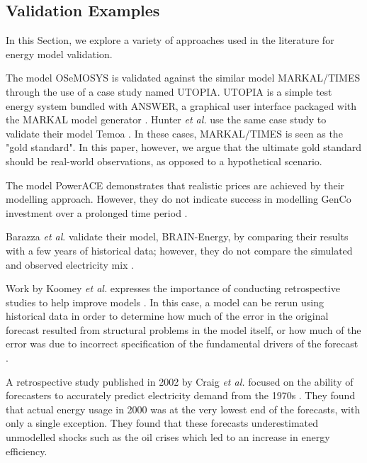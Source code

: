 \subsection{Validation Examples}

In this Section, we explore a variety of approaches used in the literature for energy model validation.

The model OSeMOSYS \cite{Howells2011} is validated against the similar model MARKAL\slash TIMES through the use of a case study named UTOPIA. UTOPIA is a simple test energy system bundled with ANSWER, a graphical user interface packaged with the MARKAL model generator \cite{Hunter2013, Noble2004}. Hunter \textit{et al.} use the same case study to validate their model Temoa \cite{Hunter2013}. In these cases, MARKAL\slash TIMES is seen as the "gold standard". In this paper, however, we argue that the ultimate gold standard should be real-world observations, as opposed to a hypothetical scenario.

The model PowerACE demonstrates that realistic prices are achieved by their modelling approach. However, they do not indicate success in modelling GenCo investment over a prolonged time period \cite{Ringler2012}.

Barazza \textit{et al}. validate their model, BRAIN-Energy, by comparing their results with a few years of historical data; however, they do not compare the simulated and observed electricity mix \cite{Barazza2020}.

Work by Koomey \textit{et al.} expresses the importance of conducting retrospective studies to help improve models \cite{Koomey2003}. In this case, a model can be rerun using historical data in order to determine how much of the error in the original forecast resulted from structural problems in the model itself, or how much of the error was due to incorrect specification of the fundamental drivers of the forecast \cite{Koomey2003}.

A retrospective study published in 2002 by Craig \textit{et al.} focused on the ability of forecasters to accurately predict electricity demand from the 1970s \cite{Craig2002}. They found that actual energy usage in 2000 was at the very lowest end of the forecasts, with only a single exception. They found that these forecasts underestimated unmodelled shocks such as the oil crises which led to an increase in energy efficiency.

